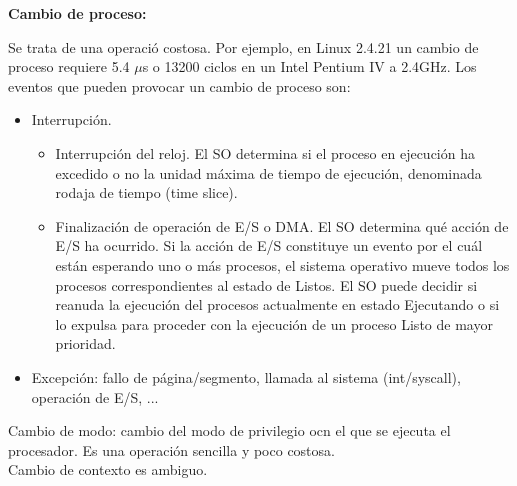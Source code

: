 \documentclass{article}
\begin{document}
\textbf{Cambio de proceso:}

Se trata de una operació costosa. Por ejemplo, en Linux 2.4.21 un cambio de proceso requiere 5.4 $\mu$s o 13200 ciclos en un Intel Pentium IV a 2.4GHz. Los eventos que pueden provocar un cambio de proceso son:
\begin{itemize}
\item Interrupción.
	\begin{itemize}
	\item Interrupción del reloj. El SO determina si el proceso en ejecución ha excedido o no la unidad máxima de tiempo de ejecución, denominada rodaja de tiempo (time slice).
	
	\item Finalización de operación de E/S o DMA. El SO determina qué acción de E/S ha ocurrido. Si la acción de E/S constituye un evento por el cuál están esperando uno o más procesos, el sistema operativo mueve todos los procesos correspondientes al estado de Listos. El SO puede decidir si reanuda la ejecución del procesos actualmente en estado Ejecutando o si lo expulsa para proceder con la ejecución de un proceso Listo de mayor prioridad.
	\end{itemize}

\item Excepción: fallo de página/segmento, llamada al sistema (int/syscall), operación de E/S, ...
\end{itemize}

Cambio de modo: cambio del modo de privilegio ocn el que se ejecuta el procesador. Es una operación sencilla y poco costosa.\\

Cambio de contexto es ambiguo.\\
\end{document}
